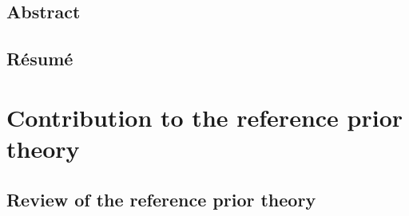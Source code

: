 \documentclass[a4paper]{book}
\begin{document}



\newpage

\chapter*{Abstract}
  \vspace*{0.5cm}
\begin{mdframed}[linecolor=white]
  \begin{mdframed}[linecolor=white]
  \abstractEN 
\end{mdframed} 
\end{mdframed}






\chapter*{Résumé}
\vspace*{0.5cm}
\begin{mdframed}[linecolor=white]
  \begin{mdframed}[linecolor=white]
\abstractFR
\end{mdframed} 
\end{mdframed}


\dominitoc
\setcounter{tocdepth}{1}
\tableofcontents
\newpage

\pagestyle{fancy}\thispagestyle{plain}





\part{Contribution to the reference prior theory}\label{part:ref-theory}

\chapter{Review of the reference prior theory}\label{chap:intro-ref}
\end{document}
